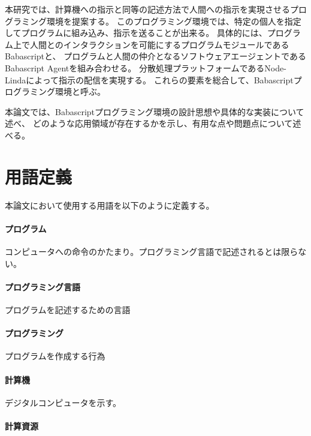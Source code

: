 本研究では、計算機への指示と同等の記述方法で人間への指示を実現させるプログラミング環境を提案する。
このプログラミング環境では、特定の個人を指定してプログラムに組み込み、指示を送ることが出来る。
具体的には、プログラム上で人間とのインタラクションを可能にするプログラムモジュールであるBabascriptと、
プログラムと人間の仲介となるソフトウェアエージェントであるBabascript
Agentを組み合わせる。
分散処理プラットフォームであるNode-Lindaによって指示の配信を実現する。
これらの要素を総合して、Babascriptプログラミング環境と呼ぶ。

本論文では、Babascriptプログラミング環境の設計思想や具体的な実装について述べ、
どのような応用領域が存在するかを示し、有用な点や問題点について述べる。

\section{用語定義}\label{ux7528ux8a9eux5b9aux7fa9}

本論文において使用する用語を以下のように定義する。

\paragraph{プログラム}\label{ux30d7ux30edux30b0ux30e9ux30e0}

コンピュータへの命令のかたまり。プログラミング言語で記述されるとは限らない。

\paragraph{プログラミング言語}\label{ux30d7ux30edux30b0ux30e9ux30dfux30f3ux30b0ux8a00ux8a9e}

プログラムを記述するための言語

\paragraph{プログラミング}\label{ux30d7ux30edux30b0ux30e9ux30dfux30f3ux30b0}

プログラムを作成する行為

\paragraph{計算機}\label{ux8a08ux7b97ux6a5f}

デジタルコンピュータを示す。

\paragraph{計算資源}\label{ux8a08ux7b97ux8cc7ux6e90}


